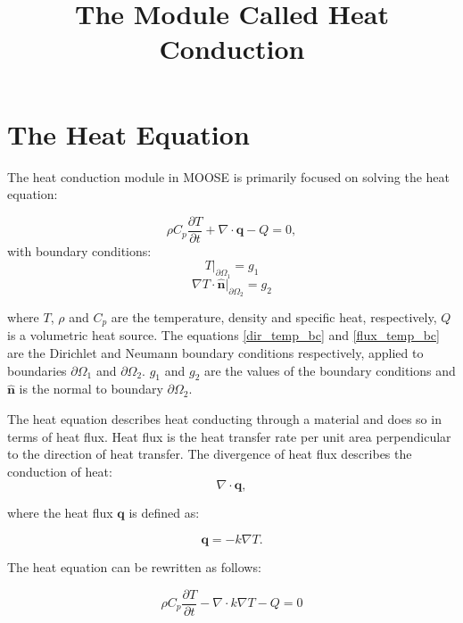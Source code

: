 \documentclass[preprint,5p]{elsarticle}
\begin{document}
\begin{frontmatter}
\title{The Module Called Heat Conduction}
\end{frontmatter}

\section{The Heat Equation}
The heat conduction module in MOOSE is primarily focused on solving the heat equation:

\begin{equation}
\rho C_p \frac{\partial T}{\partial t} + \nabla \cdot \mathbf{q} - Q = 0,
\label{heat_eqn}
\end{equation}
with boundary conditions:
\begin{equation}
\label{dir_temp_bc}
T|_{\partial\Omega_1} = g_1
\end{equation}
\begin{equation}
\label{flux_temp_bc}
\nabla T\cdot \hat{\bm{n}} |_{\partial\Omega_2} = g_2
\end{equation}

where $T$, $\rho$ and $C_p$ are the temperature, density and specific heat, respectively, $Q$ is a volumetric heat source. The equations \ref{dir_temp_bc} and \ref{flux_temp_bc} are the Dirichlet and Neumann boundary conditions respectively, applied to boundaries $\partial\Omega_1$ and $\partial\Omega_2$. $g_1$ and $g_2$ are the values of the boundary conditions and $\hat{\bm{n}}$ is the normal to boundary $\partial\Omega_2$.

The heat equation describes heat conducting through a material and does so in terms of heat flux. Heat flux is the heat transfer rate per unit area perpendicular to the direction of heat transfer. The divergence of heat flux describes the conduction of heat:
\begin{equation}
\nabla \cdot \mathbf{q},
\end{equation}

where the heat flux $\mathbf{q}$ is defined as:

\begin{equation}
\mathbf{q} = - k\nabla T.
\end{equation}

The heat equation can be rewritten as follows:

\begin{equation}
\label{heat_eqn_div_grad}
\rho C_p\frac{\partial T}{\partial t} - \nabla\cdot k\nabla T - Q = 0
\end{equation}
\end{document}
